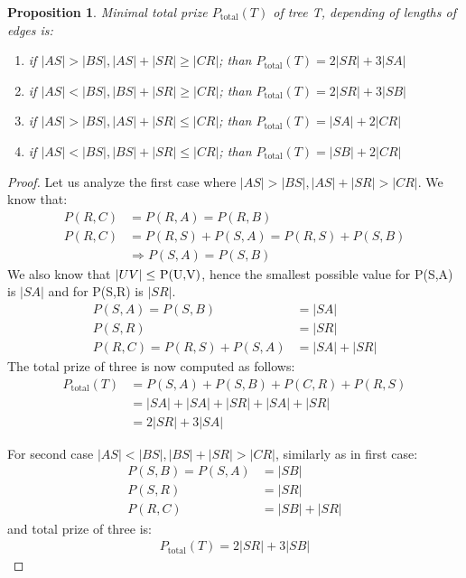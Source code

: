 \documentclass[12pt]{article}
\newcommand{\Prize}[2]{P(#1,#2)}
\newcommand{\Ptotal}[1]{P_{\text{total}}(#1)}
\newtheorem{proposition}{Proposition}
\newtheorem{proof}{Proof}
\begin{document}
	\begin{proposition}\label{prop:tp} 
		 Minimal total prize \(\Ptotal{T}\) of tree T, depending of lengths of edges is:
		\begin{enumerate}
		\item if \( |AS| > |BS|, |AS|+|SR| \geq |CR| \); than \(\Ptotal{T} = 2 |SR| + 3 |SA|\)
		\item if \( |AS| < |BS|, |BS|+|SR| \geq |CR| \); than \(\Ptotal{T} = 2 |SR| + 3 |SB|\)
		\item if \( |AS| > |BS|, |AS|+|SR| \leq |CR| \); than \(\Ptotal{T} = |SA| + 2 |CR|\)
		\item if \( |AS| < |BS|, |BS|+|SR| \leq |CR| \); than \(\Ptotal{T} = |SB| + 2 |CR|\)
		\end{enumerate}
	\end{proposition}
	\begin{proof}
	Let us analyze the first case where \( |AS| > |BS|, |AS|+|SR| > |CR| \).
	We know that:
	\begin{align*}
	\Prize{R}{C} &= \Prize{R}{A} = \Prize{R}{B} \\
	\Prize{R}{C} &= \Prize{R}{S} + \Prize{S}{A} = \Prize{R}{S} + \Prize{S}{B} \\
	&\Rightarrow \Prize{S}{A} = \Prize{S}{B}
	\end{align*}
	We also know that \( |UV| \leq  $ \Prize{U}{V}$ \), hence the smallest possible value for \Prize{S}{A} is \(|SA|\) and for \Prize{S}{R} is \(|SR|\).
	\begin{align*}	
		\Prize{S}{A} = \Prize{S}{B} &= |SA| \\
		\Prize{S}{R} &= |SR| \\
		\Prize{R}{C} = \Prize{R}{S} + \Prize{S}{A} &= |SA| + |SR|
	\end{align*}
	The total prize of three is now computed as follows:
	\begin{align*}	
		\Ptotal{T} &= \Prize{S}{A} + \Prize{S}{B} + \Prize{C}{R} + \Prize{R}{S} \\
		&= |SA| + |SA| + |SR| + |SA| + |SR| \\
		&= 2 |SR| + 3 |SA|
	\end{align*}
	
	
	For second case \( |AS| < |BS|, |BS|+|SR| > |CR| \), similarly as in first case:
	\begin{align*}
		\Prize{S}{B} = \Prize{S}{A} &= |SB| \\
		\Prize{S}{R} &= |SR| \\
		\Prize{R}{C} &= |SB| + |SR|
	\end{align*}
		and total prize of three is:
	\begin{align*}	
		\Ptotal{T} = 2 |SR| + 3 |SB|
	\end{align*}
	

\end{proof}
\end{document}
